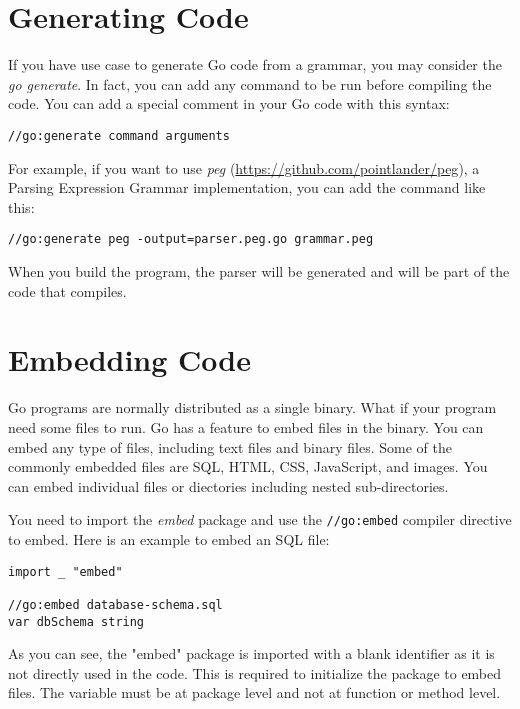 \section{Generating Code}

If you have use case to generate Go code from a grammar, you may consider
the \textit{go generate}. In fact, you can add any command to be run before
compiling the code. You can add a special comment in your Go code with this
syntax:

\begin{lstlisting}[numbers=none]
//go:generate command arguments
\end{lstlisting}

For example, if you want to use \textit{peg}
(\url{https://github.com/pointlander/peg}), a Parsing Expression Grammar
implementation, you can add the command like this:

\begin{lstlisting}[numbers=none]
//go:generate peg -output=parser.peg.go grammar.peg
\end{lstlisting}

When you build the program, the parser will be generated and will be part of the
code that compiles.

\section{Embedding Code}

Go programs are normally distributed as a single binary. What if your program
need some files to run. Go has a feature to embed files in the binary. You can
embed any type of files, including text files and binary files. Some of the
commonly embedded files are SQL, HTML, CSS, JavaScript, and images. You can
embed individual files or diectories including nested sub-directories.

You need to import the \textit{embed} package and use the \texttt{//go:embed}
compiler directive to embed. Here is an example to embed an SQL file:

\begin{lstlisting}[numbers=none]
import _ "embed"

//go:embed database-schema.sql
var dbSchema string
\end{lstlisting}

As you can see, the "embed" package is imported with a blank identifier as it is
not directly used in the code. This is required to initialize the package to
embed files. The variable must be at package level and not at function or method
level.

